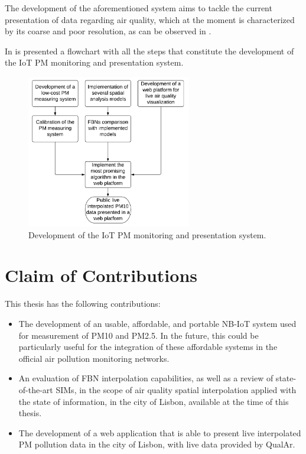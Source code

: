 The development of the aforementioned system aims to tackle the current presentation of data regarding air quality, which at the moment is characterized by its coarse and poor resolution, as can be observed in .

In  is presented a flowchart with all the steps that constitute the development of the IoT PM monitoring and presentation system.

\begin{figure}[ht]
\centering
\includegraphics[width=0.64\textwidth]{./Images/methodology-flowchart.png}
\caption{Development of the IoT PM monitoring and presentation system.}
\label{fig:methodology-flowchart}
\end{figure}

\section{Claim of Contributions}

This thesis has the following contributions:

\begin{itemize}
  \item The development of an usable, affordable, and portable \ac{NB-IoT} system used for measurement of PM10 and PM2.5. In the future, this could be particularly useful for the integration of these affordable systems in the official air pollution monitoring networks.
  \item An evaluation of FBN interpolation capabilities, as well as a review of state-of-the-art SIMs, in the scope of air quality spatial interpolation applied with the state of information, in the city of Lisbon, available at the time of this thesis.
  \item The development of a web application that is able to present live interpolated PM pollution data in the city of Lisbon, with live data provided by QualAr.
  
\end{itemize}



